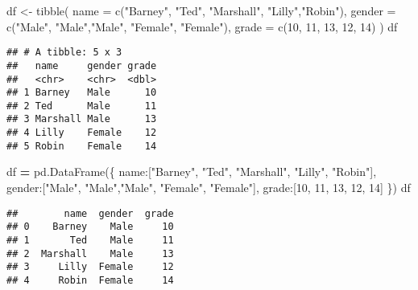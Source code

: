 \documentclass[
]{book}
\newenvironment{Shaded}{\begin{snugshade}}{\end{snugshade}}
\newcommand{\AttributeTok}[1]{\textcolor[rgb]{0.77,0.63,0.00}{#1}}
\newcommand{\DecValTok}[1]{\textcolor[rgb]{0.00,0.00,0.81}{#1}}
\newcommand{\FunctionTok}[1]{\textcolor[rgb]{0.00,0.00,0.00}{#1}}
\newcommand{\NormalTok}[1]{#1}
\newcommand{\OperatorTok}[1]{\textcolor[rgb]{0.81,0.36,0.00}{\textbf{#1}}}
\newcommand{\OtherTok}[1]{\textcolor[rgb]{0.56,0.35,0.01}{#1}}
\newcommand{\StringTok}[1]{\textcolor[rgb]{0.31,0.60,0.02}{#1}}
\begin{document}
\begin{Shaded}
\begin{Highlighting}[]
\NormalTok{df }\OtherTok{\textless{}{-}} \FunctionTok{tibble}\NormalTok{(}
  \AttributeTok{name =} \FunctionTok{c}\NormalTok{(}\StringTok{"Barney"}\NormalTok{, }\StringTok{"Ted"}\NormalTok{, }\StringTok{"Marshall"}\NormalTok{,}
           \StringTok{"Lilly"}\NormalTok{,}\StringTok{"Robin"}\NormalTok{),}
  \AttributeTok{gender =} \FunctionTok{c}\NormalTok{(}\StringTok{"Male"}\NormalTok{, }\StringTok{"Male"}\NormalTok{,}\StringTok{"Male"}\NormalTok{,}
             \StringTok{"Female"}\NormalTok{, }\StringTok{"Female"}\NormalTok{),}
  \AttributeTok{grade =} \FunctionTok{c}\NormalTok{(}\DecValTok{10}\NormalTok{, }\DecValTok{11}\NormalTok{, }\DecValTok{13}\NormalTok{, }\DecValTok{12}\NormalTok{, }\DecValTok{14}\NormalTok{)}
\NormalTok{)}
\NormalTok{df}
\end{Highlighting}
\end{Shaded}

\begin{verbatim}
## # A tibble: 5 x 3
##   name     gender grade
##   <chr>    <chr>  <dbl>
## 1 Barney   Male      10
## 2 Ted      Male      11
## 3 Marshall Male      13
## 4 Lilly    Female    12
## 5 Robin    Female    14
\end{verbatim}

\begin{Shaded}
\begin{Highlighting}[]
\NormalTok{df }\OperatorTok{=}\NormalTok{ pd.DataFrame(\{}
  \StringTok{\textquotesingle{}name\textquotesingle{}}\NormalTok{:[}\StringTok{"Barney"}\NormalTok{, }\StringTok{"Ted"}\NormalTok{, }\StringTok{"Marshall"}\NormalTok{,}
          \StringTok{"Lilly"}\NormalTok{, }\StringTok{"Robin"}\NormalTok{],}
  \StringTok{\textquotesingle{}gender\textquotesingle{}}\NormalTok{:[}\StringTok{"Male"}\NormalTok{, }\StringTok{"Male"}\NormalTok{,}\StringTok{"Male"}\NormalTok{, }
            \StringTok{"Female"}\NormalTok{, }\StringTok{"Female"}\NormalTok{],}
  \StringTok{\textquotesingle{}grade\textquotesingle{}}\NormalTok{:[}\DecValTok{10}\NormalTok{, }\DecValTok{11}\NormalTok{, }\DecValTok{13}\NormalTok{, }\DecValTok{12}\NormalTok{, }\DecValTok{14}\NormalTok{] }
\NormalTok{\})}
\NormalTok{df}
\end{Highlighting}
\end{Shaded}

\begin{verbatim}
##        name  gender  grade
## 0    Barney    Male     10
## 1       Ted    Male     11
## 2  Marshall    Male     13
## 3     Lilly  Female     12
## 4     Robin  Female     14
\end{verbatim}
\end{document}
